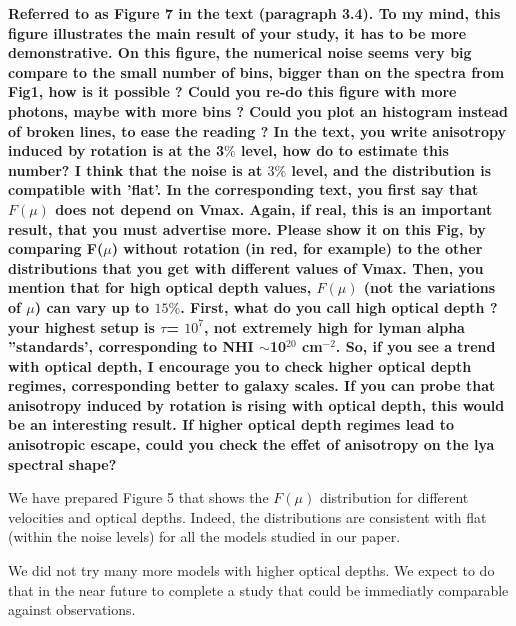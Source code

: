 \documentclass[12pt]{article}
\begin{document}
{\bf Referred to as Figure 7 in the text (paragraph 3.4). To my mind,
  this figure illustrates the main result of your study, it has to be
  more demonstrative. On this figure, the numerical noise seems very
  big compare to the small number of bins, bigger than on the spectra
  from Fig1, how is it possible ? Could you re-do this figure with
  more photons, maybe with more bins ? Could you plot an histogram
  instead of broken lines, to ease the reading ? In the text, you
  write anisotropy induced by rotation is at the 3$\%$ level, how do
  to estimate this number? I think that the noise is at $3\%$ level,
  and the distribution is compatible with ’flat’. In the corresponding
  text, you first say that $F(\mu)$ does not depend on Vmax. Again, if
  real, this is an important result, that you must advertise
  more. Please show it on this Fig, by comparing F($\mu$) without rotation
  (in red, for example) to the other distributions that you get with
  different values of Vmax. Then, you mention that for high optical
  depth values, $F(\mu)$ (not the variations of $\mu$) can vary up to
  $15\%$. First, what do you call high optical depth ? your highest
  setup is $\tau$= $10^7$, not extremely high for lyman alpha ”standards’,
  corresponding to NHI $\sim$10$^{20}$ cm$^{-2}$. So, if you see a trend with
  optical depth, I encourage you to check higher optical depth
  regimes, corresponding better to galaxy scales. If you can probe
  that anisotropy induced by rotation is rising with optical depth,
  this would be an interesting result. If higher optical depth regimes
  lead to anisotropic escape, could you check the effet of anisotropy
  on the lya spectral shape?} 


We have prepared Figure 5 that shows the $F(\mu)$ distribution for
different velocities and optical depths. Indeed, the distributions are
consistent with flat (within the noise levels) for all the models
studied in our paper. 

We did not try many more models with higher optical depths. We expect
to do that in the near future to complete a study that could be
immediatly comparable against observations.
\end{document}
